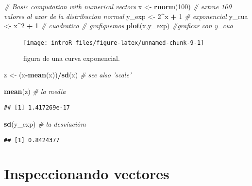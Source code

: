 \documentclass[
]{book}
\newenvironment{Shaded}{\begin{snugshade}}{\end{snugshade}}
\newcommand{\CommentTok}[1]{\textcolor[rgb]{0.56,0.35,0.01}{\textit{#1}}}
\newcommand{\DecValTok}[1]{\textcolor[rgb]{0.00,0.00,0.81}{#1}}
\newcommand{\KeywordTok}[1]{\textcolor[rgb]{0.13,0.29,0.53}{\textbf{#1}}}
\newcommand{\NormalTok}[1]{#1}
\newcommand{\OperatorTok}[1]{\textcolor[rgb]{0.81,0.36,0.00}{\textbf{#1}}}
\newcommand{\StringTok}[1]{\textcolor[rgb]{0.31,0.60,0.02}{#1}}
\begin{document}
\begin{Shaded}
\begin{Highlighting}[]
\CommentTok{# Basic computation with numerical vectors}
\NormalTok{x <-}\StringTok{ }\KeywordTok{rnorm}\NormalTok{(}\DecValTok{100}\NormalTok{) }\CommentTok{# extrae 100 valores al azar de la distribucion normal}
\NormalTok{y_exp <-}\StringTok{ }\DecValTok{2}\OperatorTok{^}\NormalTok{x }\OperatorTok{+}\StringTok{ }\DecValTok{1} \CommentTok{# exponencial}
\NormalTok{y_cua <-}\StringTok{ }\NormalTok{x}\OperatorTok{^}\DecValTok{2} \OperatorTok{+}\StringTok{ }\DecValTok{1} \CommentTok{# cuadratica}
\CommentTok{# grafiquemos}
\KeywordTok{plot}\NormalTok{(x,y_exp) }\CommentTok{#graficar con y_cua}
\end{Highlighting}
\end{Shaded}

\begin{figure}

{\centering \texttt{[image: introR\_files/figure-latex/unnamed-chunk-9-1]} 

}

\caption{figura de una curva exponencial.}\label{fig:unnamed-chunk-9}
\end{figure}

\begin{Shaded}
\begin{Highlighting}[]
\NormalTok{z <-}\StringTok{ }\NormalTok{(x}\OperatorTok{-}\KeywordTok{mean}\NormalTok{(x))}\OperatorTok{/}\KeywordTok{sd}\NormalTok{(x)  }\CommentTok{# see also 'scale'}

\KeywordTok{mean}\NormalTok{(z) }\CommentTok{# la media}
\end{Highlighting}
\end{Shaded}

\begin{verbatim}
## [1] 1.417269e-17
\end{verbatim}

\begin{Shaded}
\begin{Highlighting}[]
\KeywordTok{sd}\NormalTok{(y_exp) }\CommentTok{# la desviacióm}
\end{Highlighting}
\end{Shaded}

\begin{verbatim}
## [1] 0.8424377
\end{verbatim}

\hypertarget{inspeccionando-vectores}{%
\section{Inspeccionando vectores}\label{inspeccionando-vectores}}
\end{document}
